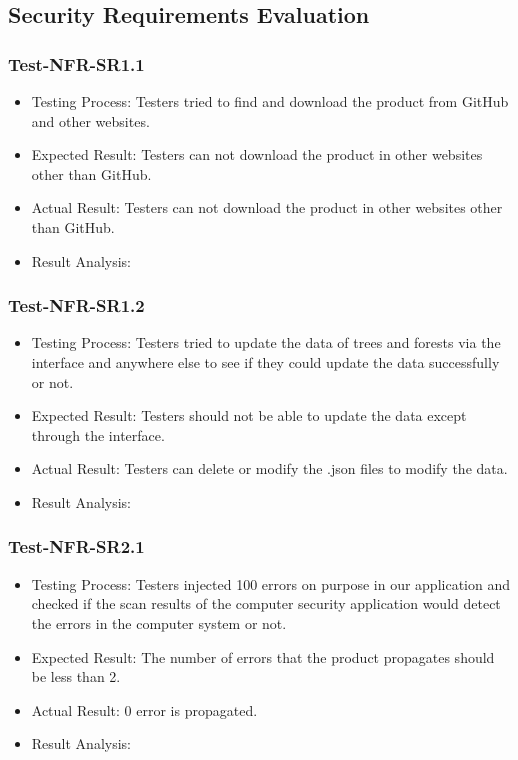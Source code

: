 \documentclass[12pt, titlepage]{article}
\begin{document}
\subsection{Security Requirements Evaluation}
\subsubsection{Test-NFR-SR1.1}
\begin{itemize}
    \item Testing Process:  Testers tried to find and download the product from GitHub and other websites.
    \item Expected Result: Testers can not download the product in other websites other than GitHub.
    \item Actual Result: Testers can not download the product in other websites other than GitHub.
    \item Result Analysis: \pass
\end{itemize}

\subsubsection{Test-NFR-SR1.2}
\begin{itemize}
    \item Testing Process:  Testers tried to update the data of trees and forests via the interface and anywhere else to see if they could update the data successfully or not.
    \item Expected Result: Testers should not be able to update the data except through the interface. 
    \item Actual Result: Testers can delete or modify the .json files to modify the data.
    \item Result Analysis: \fail
\end{itemize}




\subsubsection{Test-NFR-SR2.1}
\begin{itemize}
    \item Testing Process:  Testers injected 100 errors on purpose in our application and checked
if the scan results of the computer security application would detect the errors in the computer
system or not.
    \item Expected Result: The number of errors that the product propagates should be less than 2.
    \item Actual Result: 0 error is propagated. 
    \item Result Analysis: \pass
\end{itemize}
\end{document}
